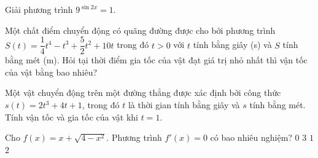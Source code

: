 \begin{ex}%
	 Giải phương trình $9^{\sin 2x}=1$.
\end{ex}

\begin{bt}%

	Một chất điểm chuyển động có quãng đường được cho bởi phương trình $S\left(t\right)=\dfrac{1}{4}t^4-t^3+\dfrac{5}{2}t^2+10t$ trong đó $t>0$ với $t$ tính bằng giây (s) và $S$ tính bằng mét (m). Hỏi tại thời điểm gia tốc của vật đạt giá trị nhỏ nhất thì vận tốc của vật bằng bao nhiêu?
		

\end{bt}

\begin{bt}%
	Một vật chuyển động trên một  đường thẳng được xác định bởi công thức $s(t)=2t^3+4t+1$, trong đó $t$ là thời gian tính bằng giây và $s$ tính bằng mét. Tính vận tốc và gia tốc của vật khi $t=1$.
\end{bt}

\begin{ex}%
	 Cho $f(x)=x+\sqrt{4-x^2}$. Phương trình $f'(x)=0$ có bao nhiêu nghiệm?
	 \choice
		 {$0$}
		{$3$} 
		 {\True $1$}
		 {$2$}
\end{ex}


